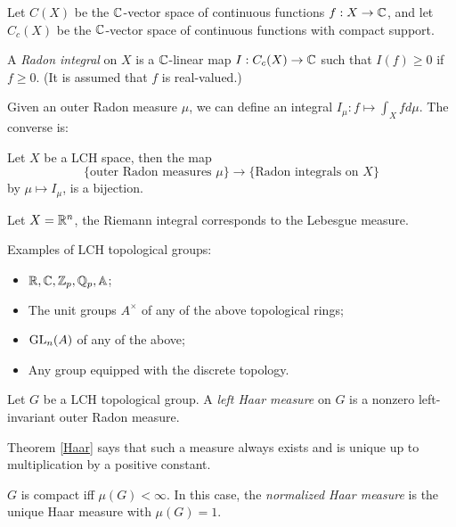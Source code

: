 \documentclass[11pt]{amsart}
\begin{document}
Let $C(X)$ be the $\mathbb{C}$-vector space of continuous functions $f:X\to \mathbb{C}$, and let $C_c(X)$ be the $\mathbb{C}$-vector space of continuous functions with compact support.


\begin{defn}
    A \emph{Radon integral} on $X$ is a $\mathbb{C}$-linear map $I: C_c(X)\to \mathbb{C}$ such that $I(f) \ge 0$ if $f\ge 0$. (It is assumed that $f$ is real-valued.)
\end{defn}

Given an outer Radon measure $\mu$, we can define an integral $I_\mu: f\mapsto \int_X f d\mu$. The converse is:

\begin{thm}
    Let $X$ be a LCH space, then the map
    \[\{\text{outer Radon measures } \mu\} \to \{\text{Radon integrals on } X\}\]
    by $\mu\mapsto I_\mu$, is a bijection.
\end{thm}

\begin{exm}
    Let $X = \mathbb{R}^n$, the Riemann integral corresponds to the Lebesgue measure.
\end{exm}

\begin{exm}
    Examples of LCH topological groups:
    \begin{itemize}
        \item $\mathbb{R}, \mathbb{C}, \mathbb{Z}_p, \mathbb{Q}_p, \mathbb{A}$;
        \item The unit groups $A^\times$ of any of the above topological rings;
        \item $\mathrm{GL}_n(A)$ of any of the above;
        \item Any group equipped with the discrete topology.
    \end{itemize}
\end{exm}

\begin{defn}
    Let $G$ be a LCH topological group. A \emph{left Haar measure} on $G$ is a nonzero left-invariant outer Radon measure.
\end{defn}

Theorem \ref{Haar} says that such a measure always exists and is unique up to multiplication by a positive constant.

\begin{prop}
    $G$ is compact iff $\mu(G) < \infty$. In this case, the \emph{normalized Haar measure} is the unique Haar measure with $\mu(G) = 1$.
\end{prop}
\end{document}
